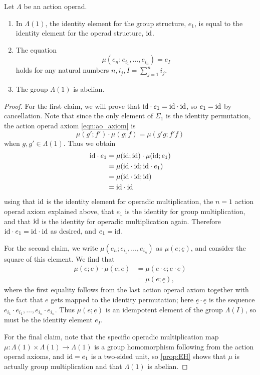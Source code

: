 \begin{lem}\label{lem:calclem}
Let $\Lambda$ be an action operad.
\begin{enumerate}
\item In $\Lambda(1)$, the identity element for the group structure, $e_1$, is equal to the identity element for the operad structure, $\textrm{id}$.
\item The equation
  \[
    \mu(e_{n}; e_{i_{1}}, \ldots, e_{i_{n}}) = e_{I}
  \]
holds for any natural numbers $n, i_{j}, I = \sum_{j=1}^n i_{j}$.
\item The group $\Lambda(1)$ is abelian.
\end{enumerate}
\end{lem}
\begin{proof}
For the first claim, we will prove that $\textrm{id} \cdot e_1 = \textrm{id} \cdot \textrm{id}$, so $e_1 = \textrm{id}$ by cancellation.
Note that since the only element of $\Sigma_1$ is the identity permutation, the action operad axiom \cref{eqn:ao_axiom} is
\[
\mu(g';f')\cdot \mu(g;f) = \mu(g'g; f'f)
\]
when $g, g' \in \Lambda(1)$.
Thus we obtain 
\begin{align*}
\textrm{id} \cdot e_1 & = \mu(\textrm{id}; \textrm{id}) \cdot \mu(\textrm{id}; e_{1}) \\
& = \mu(\textrm{id} \cdot \textrm{id}; \textrm{id} \cdot e_{1}) \\
    &= \mu(\textrm{id} \cdot \textrm{id}; \textrm{id}) \\
    &= \textrm{id} \cdot \textrm{id}
\end{align*}
using that $\textrm{id}$ is the identity element for operadic multiplication, the $n=1$ action operad axiom explained above, that $e_1$ is the identity for group multiplication, and that $\textrm{id}$ is the identity for operadic multiplication again.
Therefore $\textrm{id} \cdot e_1 = \textrm{id} \cdot \textrm{id}$ as desired, and $e_1 = \textrm{id}$.


For the second claim, we write $\mu(e_{n}; e_{i_{1}}, \ldots, e_{i_{n}})$ as $\mu(e; \underline{e})$, and consider the square of this element. We find that
  \begin{align*}
    \mu(e; \underline{e}) \cdot \mu(e; \underline{e}) & = \mu(e \cdot e; \underline{e} \cdot \underline{e}) \\
    &= \mu(e; \underline{e}),
  \end{align*}
where the first equality follows from the last action operad axiom together with the fact that $e$ gets mapped to the identity permutation; here $\underline{e} \cdot \underline{e}$ is the sequence $e_{i_{1}} \cdot e_{i_{1}}, \ldots, e_{i_{n}} \cdot e_{i_{n}}$. Thus $\mu(e; \underline{e})$ is an idempotent element of the group $\Lambda(I)$, so must be the identity element $e_{I}$.

For the final claim, note that the specific operadic multiplication map $\mu \colon \Lambda(1) \times \Lambda(1) \rightarrow \Lambda(1)$ is a group homomorphism following from the action operad axioms, and $\textrm{id} = e_{1}$ is a two-sided unit, so \cref{prop:EH} shows that $\mu$ is actually group multiplication and that $\Lambda(1)$ is abelian.
\end{proof}

